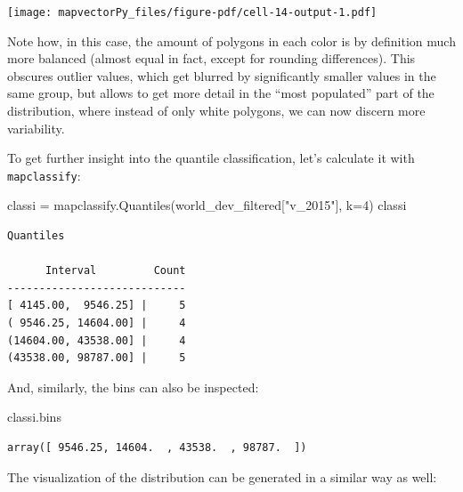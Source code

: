 \documentclass[
  letterpaper,
  DIV=11,
  numbers=noendperiod]{scrreprt}
\newenvironment{Shaded}{\begin{snugshade}}{\end{snugshade}}
\newcommand{\DecValTok}[1]{\textcolor[rgb]{0.68,0.00,0.00}{#1}}
\newcommand{\NormalTok}[1]{\textcolor[rgb]{0.00,0.23,0.31}{#1}}
\newcommand{\OperatorTok}[1]{\textcolor[rgb]{0.37,0.37,0.37}{#1}}
\newcommand{\StringTok}[1]{\textcolor[rgb]{0.13,0.47,0.30}{#1}}
\begin{document}
\texttt{[image: mapvectorPy\_files/figure-pdf/cell-14-output-1.pdf]}

Note how, in this case, the amount of polygons in each color is by
definition much more balanced (almost equal in fact, except for rounding
differences). This obscures outlier values, which get blurred by
significantly smaller values in the same group, but allows to get more
detail in the ``most populated'' part of the distribution, where instead
of only white polygons, we can now discern more variability.

To get further insight into the quantile classification, let's calculate
it with \texttt{mapclassify}:

\begin{Shaded}
\begin{Highlighting}[]
\NormalTok{classi }\OperatorTok{=}\NormalTok{ mapclassify.Quantiles(world\_dev\_filtered[}\StringTok{"v\_2015"}\NormalTok{], k}\OperatorTok{=}\DecValTok{4}\NormalTok{)}
\NormalTok{classi}
\end{Highlighting}
\end{Shaded}

\begin{verbatim}
Quantiles

      Interval         Count
----------------------------
[ 4145.00,  9546.25] |     5
( 9546.25, 14604.00] |     4
(14604.00, 43538.00] |     4
(43538.00, 98787.00] |     5
\end{verbatim}

And, similarly, the bins can also be inspected:

\begin{Shaded}
\begin{Highlighting}[]
\NormalTok{classi.bins}
\end{Highlighting}
\end{Shaded}

\begin{verbatim}
array([ 9546.25, 14604.  , 43538.  , 98787.  ])
\end{verbatim}

The visualization of the distribution can be generated in a similar way
as well:
\end{document}

